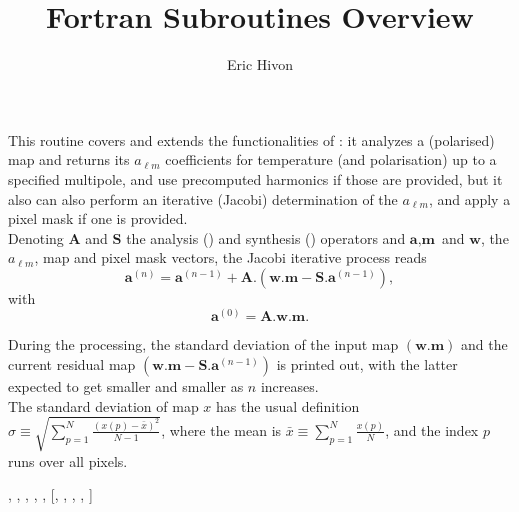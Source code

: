 
\sloppy


\title{\healpix Fortran Subroutines Overview}
 \section[map2alm\_iterative*]{ }
\label{sub:map2alm_iterative}
\author{Eric Hivon}

\begin{facility}
{This routine covers and extends the functionalities of : it
analyzes a (polarised)  map and returns
its $a_{\ell m}$ coefficients for temperature (and polarisation) up to a specified
multipole, and use precomputed harmonics if those
are provided, but it also can also perform an iterative (Jacobi) determination of the $a_{\ell m}$, and
apply a pixel mask if one is provided.\\
\newcommand{\bA}{\textbf{A}}
\newcommand{\bS}{\textbf{S}}
\newcommand{\ba}{\textbf{a}}
\newcommand{\bm}{\textbf{m}}
\newcommand{\bw}{\textbf{w}}
Denoting $\bA$ and $\bS$ the 
analysis  () and
synthesis ()
operators and  $\ba, \bm$ and $\bw$, the $a_{\ell m}$, map and pixel mask vectors, the
Jacobi iterative process reads 
\begin{equation}
	\ba^{(n)} = \ba^{(n-1)} + \bA. \left( \bw.\bm - \bS .\ba^{(n-1)} \right),
\end{equation}
with
\begin{equation}
	\ba^{(0)} = \bA.\bw.\bm.
\end{equation}

During the processing, the standard deviation of the input map $\left(\bw.\bm\right)$ 
and the current residual map $\left(\bw.\bm - \bS .\ba^{(n-1)}\right)$ is printed out, with the latter expected
to get smaller and smaller as $n$ increases.\\
The standard deviation of map $x$ has the usual definition
$\sigma \equiv \sqrt{\sum_{p=1}^{N}\frac{(x(p)-\bar{x})^2}{N-1}}$, where the mean is
$\bar{x} \equiv  \sum_{p=1}^{N} \frac{x(p)}{N}$, and the index $p$ runs over all pixels.
}
{\modAlmTools}
\end{facility}

\begin{f90format}
{%
, %
, %
, %
, %
, %
 [, %
, %
 ,
%
, %
]}
\end{f90format}

